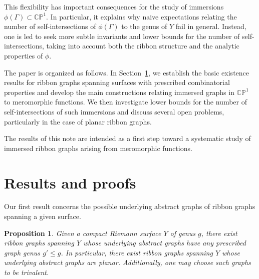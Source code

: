 \documentclass[reqno]{amsart}
\newtheorem{proposition}[theorem]{Proposition}
\theoremstyle{definition}
\begin{document}
This flexibility has important consequences for the study of immersions $\phi(\Gamma) \subset \mathbb{CP}^1$. In particular, it explains why naive expectations relating the number of self-intersections of $\phi(\Gamma)$ to the genus of $Y$ fail in general. Instead, one is led to seek more subtle invariants and lower bounds for the number of self-intersections, taking into account both the ribbon structure and the analytic properties of $\phi$.

The paper is organized as follows. In Section~\ref{sec:res}, we establish the basic existence results for ribbon graphs spanning surfaces with prescribed combinatorial properties and develop the main constructions relating immersed graphs in $\mathbb{CP}^1$ to meromorphic functions. We then investigate lower bounds for the number of self-intersections of such immersions and discuss several open problems, particularly in the case of planar ribbon graphs.

The results of this note are intended as a first step toward a systematic study of immersed ribbon graphs arising from meromorphic functions.



\section{Results and proofs}\label{sec:res}

Our first result concerns the possible underlying abstract graphs of ribbon graphs spanning a given surface.

\begin{proposition}\label{pr:planar}
Given a compact Riemann surface $Y$ of genus $g$, there exist ribbon graphs spanning $Y$ whose underlying abstract graphs have any prescribed graph genus $g'\le g$. In particular, there exist ribbon graphs spanning $Y$ whose underlying abstract graphs are planar. Additionally, one may choose such graphs to be trivalent.
\end{proposition}
\end{document}

